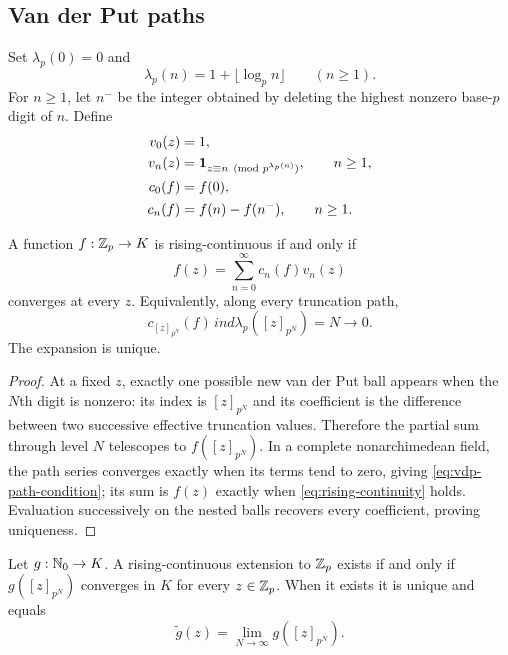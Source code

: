\subsection{Van der Put paths}

Set $\lambda_p(0)=0$ and
\[
 \lambda_p(n)=1+\lfloor\log_p n\rfloor\qquad(n\geq1).
\]
For $n\geq1$, let $n^-$ be the integer obtained by deleting the highest
nonzero base-$p$ digit of $n$.  Define
\begin{align}
 v_0(z)&=1,\\
 v_n(z)&=\mathbf 1_{z\equiv n\pmod{p^{\lambda_p(n)}}},\qquad n\geq1,\label{eq:vdp-basis}\\
 c_0(f)&=f(0),\\
 c_n(f)&=f(n)-f(n^-),\qquad n\geq1.
\end{align}

\begin{theorem}
\label{thm:rising-vdp}
A function $f:\mathbb Z_p\to K$ is rising-continuous if and only if
\begin{equation}
\label{eq:rising-vdp}
 f(z)=\sum_{n=0}^{\infty}c_n(f)v_n(z)
\end{equation}
converges at every $z$.  Equivalently, along every truncation path,
\begin{equation}
\label{eq:vdp-path-condition}
 c_{[z]_{p^N}}(f)\,ind{\lambda_p([z]_{p^N})=N}
 \longrightarrow0.
\end{equation}
The expansion is unique.
\end{theorem}

\begin{proof}
At a fixed $z$, exactly one possible new van der Put ball appears when the
$N$th digit is nonzero: its index is $[z]_{p^N}$ and its coefficient is the
difference between two successive effective truncation values.  Therefore
the partial sum through level $N$ telescopes to $f([z]_{p^N})$.  In a
complete nonarchimedean field, the path series converges exactly when its
terms tend to zero, giving \cref{eq:vdp-path-condition}; its sum is $f(z)$
exactly when \cref{eq:rising-continuity} holds.  Evaluation successively on
the nested balls recovers every coefficient, proving uniqueness.
\end{proof}

\begin{corollary}
\label{cor:unique-rising-continuation}
Let $g:\mathbb N_0\to K$.  A rising-continuous extension to $\mathbb Z_p$ exists if and
only if $g([z]_{p^N})$ converges in $K$ for every $z\in\mathbb Z_p$.  When it exists
it is unique and equals
\[
 \widetilde g(z)=\lim_{N\to\infty}g([z]_{p^N}).
\]
\end{corollary}

